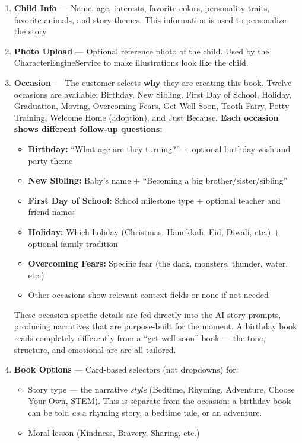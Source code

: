 \documentclass[12pt, letterpaper, oneside]{book}
\begin{document}
\begin{enumerate}[leftmargin=2em]
  \item \textbf{Child Info} --- Name, age, interests, favorite colors, personality traits, favorite animals, and story themes. This information is used to personalize the story.
  \item \textbf{Photo Upload} --- Optional reference photo of the child. Used by the CharacterEngineService to make illustrations look like the child.
  \item \textbf{Occasion} --- The customer selects \textbf{why} they are creating this book. Twelve occasions are available: Birthday, New Sibling, First Day of School, Holiday, Graduation, Moving, Overcoming Fears, Get Well Soon, Tooth Fairy, Potty Training, Welcome Home (adoption), and Just Because. \textbf{Each occasion shows different follow-up questions:}
    \begin{itemize}[leftmargin=1.5em]
      \item \textbf{Birthday:} ``What age are they turning?'' + optional birthday wish and party theme
      \item \textbf{New Sibling:} Baby's name + ``Becoming a big brother/sister/sibling''
      \item \textbf{First Day of School:} School milestone type + optional teacher and friend names
      \item \textbf{Holiday:} Which holiday (Christmas, Hanukkah, Eid, Diwali, etc.) + optional family tradition
      \item \textbf{Overcoming Fears:} Specific fear (the dark, monsters, thunder, water, etc.)
      \item Other occasions show relevant context fields or none if not needed
    \end{itemize}
    These occasion-specific details are fed directly into the AI story prompts, producing narratives that are purpose-built for the moment. A birthday book reads completely differently from a ``get well soon'' book --- the tone, structure, and emotional arc are all tailored.
  \item \textbf{Book Options} --- Card-based selectors (not dropdowns) for:
    \begin{itemize}[leftmargin=1.5em]
      \item Story type --- the narrative \textit{style} (Bedtime, Rhyming, Adventure, Choose Your Own, STEM). This is separate from the occasion: a birthday book can be told \textit{as} a rhyming story, a bedtime tale, or an adventure.
      \item Moral lesson (Kindness, Bravery, Sharing, etc.)

\end{itemize}
\end{enumerate}
\end{document}
